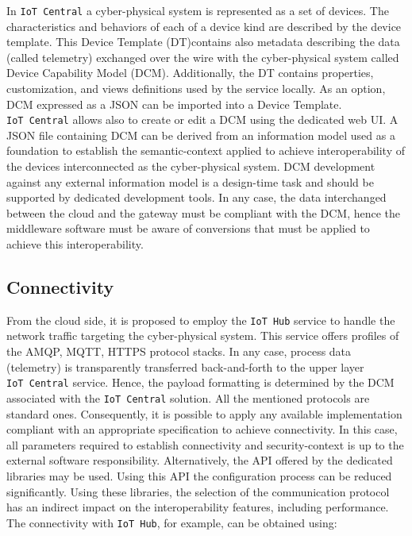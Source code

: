 \documentclass[
]{article}
\begin{document}
In \texttt{IoT\ Central} a cyber-physical system is represented as a set
of devices. The characteristics and behaviors of each of a device kind
are described by the device template. This Device Template (DT)contains
also metadata describing the data (called telemetry) exchanged over the
wire with the cyber-physical system called Device Capability Model
(DCM). Additionally, the DT contains properties, customization, and
views definitions used by the service locally. As an option, DCM
expressed as a JSON can be imported into a Device Template.
\texttt{IoT\ Central} allows also to create or edit a DCM using the
dedicated web UI. A JSON file containing DCM can be derived from an
information model used as a foundation to establish the semantic-context
applied to achieve interoperability of the devices interconnected as the
cyber-physical system. DCM development against any external information
model is a design-time task and should be supported by dedicated
development tools. In any case, the data interchanged between the cloud
and the gateway must be compliant with the DCM, hence the middleware
software must be aware of conversions that must be applied to achieve
this interoperability.

\hypertarget{connectivity}{%
\subsection{Connectivity}\label{connectivity}}

From the cloud side, it is proposed to employ the \texttt{IoT\ Hub}
service to handle the network traffic targeting the cyber-physical
system. This service offers profiles of the AMQP, MQTT, HTTPS protocol
stacks. In any case, process data (telemetry) is transparently
transferred back-and-forth to the upper layer \texttt{IoT\ Central}
service. Hence, the payload formatting is determined by the DCM
associated with the \texttt{IoT\ Central} solution. All the mentioned
protocols are standard ones. Consequently, it is possible to apply any
available implementation compliant with an appropriate specification to
achieve connectivity. In this case, all parameters required to establish
connectivity and security-context is up to the external software
responsibility. Alternatively, the API offered by the dedicated
libraries may be used. Using this API the configuration process can be
reduced significantly. Using these libraries, the selection of the
communication protocol has an indirect impact on the interoperability
features, including performance. The connectivity with
\texttt{IoT\ Hub}, for example, can be obtained using:
\end{document}
